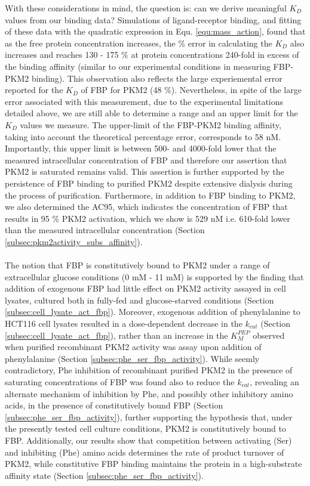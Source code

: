 With these considerations in mind, the question is: can we derive meaningful $K_D$ values from our binding data? Simulations of ligand-receptor binding, and fitting of these data with the quadratic expression in Equ. \ref{equ:mass_action}, found that as the free protein concentration increases, the \% error in calculating the $K_D$ also increases and reaches 130 - 175 \% at protein concentrations 240-fold in excess of the binding affinity (similar to our experimental conditions in measuring FBP-PKM2 binding). This observation also reflects the large experiemental error reported for the $K_D$ of FBP for PKM2 (48 \%). Nevertheless, in spite of the large error associated with this measurement, due to the experimental limitations detailed above, we are still able to determine a range and an upper limit for the $K_D$ values we measure. The upper-limit of the FBP-PKM2 binding affinity, taking into account the theoretical percentage error, corresponds to 58 nM. Importantly, this upper limit is between 500- and 4000-fold lower that the measured intracellular concentration of FBP and therefore our assertion that PKM2 is saturated remains valid. This assertion is further supported by the persistence of FBP binding to purified PKM2 despite extensive dialysis during the process of purification. Furthermore, in addition to FBP binding to PKM2, we also determined the AC95, which indicates the concentration of FBP that results in 95 \% PKM2 activation, which we show is 529 nM i.e. 610-fold lower than the measured intracellular concentration (Section \ref{subsec:pkm2activity_subs_affinity}). 
%
%
\\\\
%
%
The notion that FBP is constitutively bound to PKM2 under a range of extracellular glucose conditions (0 mM - 11 mM) is supported by the finding that addition of exogenous FBP had little effect on PKM2 activity assayed in cell lysates, cultured both in fully-fed and glucose-starved conditions (Section \ref{subsec:cell_lysate_act_fbp}). Moreover, exogenous addition of phenylalanine to HCT116 cell lysates resulted in a dose-dependent decrease in the $k_{cat}$ (Section \ref{subsec:cell_lysate_act_fbp}), rather than an increase in the $K_{M}^{PEP}$ observed when purified recombinant PKM2 activity was assay upon addition of phenylalanine (Section \ref{subsec:phe_ser_fbp_activity}). While seemly contradictory, Phe inhibition of recombinant purified PKM2 in the presence of saturating concentrations of FBP was found also to reduce the $k_{cat}$, revealing an alternate mechanism of inhibition by Phe, and possibly other inhibitory amino acids, in the presence of constitutively bound FBP (Section \ref{subsec:phe_ser_fbp_activity}), further supporting the hypothesis that, under the presently tested cell culture conditions, PKM2 is constitutively bound to FBP. Additionally, our results show that competition between activating (Ser) and inhibiting (Phe) amino acids determines the rate of product turnover of PKM2, while constitutive FBP binding maintains the protein in a high-substrate affinity state (Section \ref{subsec:phe_ser_fbp_activity}). 
